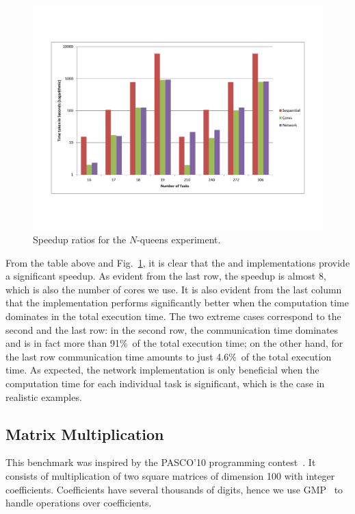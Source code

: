 \documentclass{llncs}
\begin{document}
\begin{figure}[t]
  \vspace*{-4em}
  \begin{center}
    \includegraphics[width=\textwidth]{chart1.pdf}
  \end{center}
  \vspace*{-5em}
  \caption{Speedup ratios for the $N$-queens experiment.}
\label{fig:queens}
\end{figure}
From the table above and Fig.~\ref{fig:queens},
it is clear that the  and 
implementations provide a significant speedup. As evident from the
last row, the speedup is almost 8, which is also the number of
cores we use.  It is also evident from the last column that the
 implementation performs significantly better when the
computation time dominates in the total execution time.  The two extreme
cases correspond to the second and the last row: in the second row, the
communication time dominates and is in fact more than 91\%\ of the
total execution time; on the other hand, for the last row
communication time amounts to just 4.6\%\ of the total execution time.
As expected, the network implementation is only beneficial when the
computation time for each individual task is significant, which is the
case in realistic examples.

\subsection{Matrix Multiplication}\label{sec:matrix}

This benchmark was inspired by the PASCO'10 programming contest~\cite{PASCO}.
It consists of multiplication of
two square matrices of dimension 100 with integer coefficients.
Coefficients have several thousands of digits, hence we use
GMP~\cite{GMP} to handle operations over coefficients.
\end{document}
